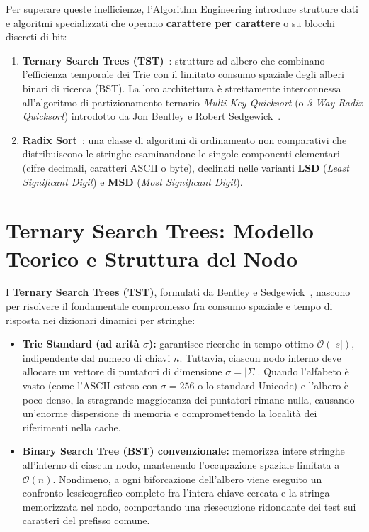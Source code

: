 Per superare queste inefficienze, l'Algorithm Engineering introduce strutture dati e algoritmi specializzati che operano \textbf{carattere per carattere} o su blocchi discreti di bit:
\begin{enumerate}
  \item \textbf{Ternary Search Trees (TST)}~\cite{bentley1997}: strutture ad albero che combinano l'efficienza temporale dei Trie con il limitato consumo spaziale degli alberi binari di ricerca (BST). La loro architettura \`e strettamente interconnessa all'algoritmo di partizionamento ternario \textit{Multi-Key Quicksort} (o \textit{3-Way Radix Quicksort}) introdotto da Jon Bentley e Robert Sedgewick~\cite{bentley1997}.
  \item \textbf{Radix Sort}~\cite{knuth1998vol3, sedgewickwayne2011}: una classe di algoritmi di ordinamento non comparativi che distribuiscono le stringhe esaminandone le singole componenti elementari (cifre decimali, caratteri ASCII o byte), declinati nelle varianti \textbf{LSD} (\textit{Least Significant Digit}) e \textbf{MSD} (\textit{Most Significant Digit}).
\end{enumerate}

\FloatBarrier
\section{Ternary Search Trees: Modello Teorico e Struttura del Nodo}
\label{sec:tst-modello-teorico}

I \textbf{Ternary Search Trees (TST)}, formulati da Bentley e Sedgewick~\cite{bentley1997}, nascono per risolvere il fondamentale compromesso fra consumo spaziale e tempo di risposta nei dizionari dinamici per stringhe:
\begin{itemize}
  \item \textbf{Trie Standard (ad arit\`a $\sigma$):} garantisce ricerche in tempo ottimo $\mathcal{O}(|s|)$, indipendente dal numero di chiavi $n$. Tuttavia, ciascun nodo interno deve allocare un vettore di puntatori di dimensione $\sigma = |\Sigma|$. Quando l'alfabeto \`e vasto (come l'ASCII esteso con $\sigma = 256$ o lo standard Unicode) e l'albero \`e poco denso, la stragrande maggioranza dei puntatori rimane nulla, causando un'enorme dispersione di memoria e compromettendo la localit\`a dei riferimenti nella cache.
  \item \textbf{Binary Search Tree (BST) convenzionale:} memorizza intere stringhe all'interno di ciascun nodo, mantenendo l'occupazione spaziale limitata a $\mathcal{O}(n)$. Nondimeno, a ogni biforcazione dell'albero viene eseguito un confronto lessicografico completo fra l'intera chiave cercata e la stringa memorizzata nel nodo, comportando una riesecuzione ridondante dei test sui caratteri del prefisso comune.
\end{itemize}

